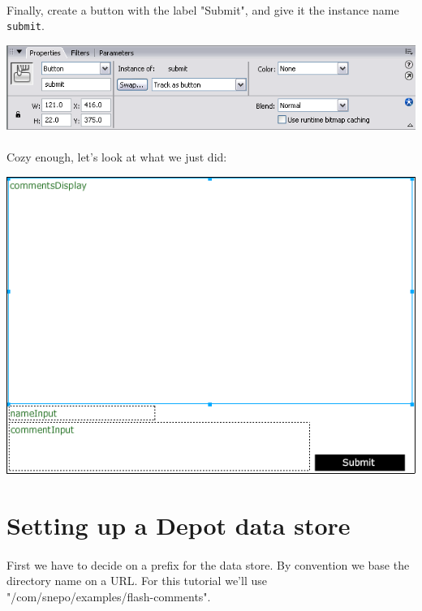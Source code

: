 \documentclass[12pt]{report}
\begin{document}
\paragraph{}
Finally, create a button with the label "Submit", and give it the
instance name \texttt{submit}.


\begin{center}
\includegraphics[scale=0.70]{flash-tutorial-images/usage-submit-properties.png}
\end{center}



\paragraph{}
Cozy enough, let's look at what we just did:

\begin{center}
\includegraphics[scale=0.70]{flash-tutorial-images/usage-comments-idle.png}
\end{center}

\section{Setting up a Depot data store}

\paragraph{}
First we have to decide on a prefix for the data store. By convention
we base the directory name on a URL. For this tutorial we'll use
"/com/snepo/examples/flash-comments".
\end{document}
